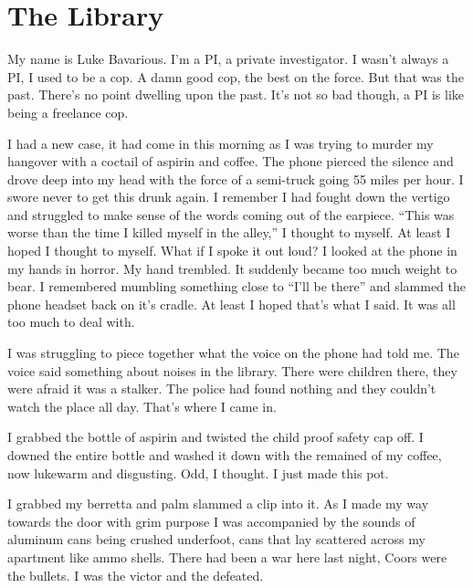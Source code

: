 \chapter{The Library}





My name is Luke Bavarious. I'm a PI, a private investigator. I
wasn't always a PI, I used to be a cop. A damn good cop, the best
on the force. But that was the past. There's no point dwelling upon
the past. It's not so bad though, a PI is like being a freelance
cop.



I had a new case, it had come in this morning as I was trying to
murder my hangover with a coctail of aspirin and coffee. The phone
pierced the silence and drove deep into my head with the force of a
semi-truck going 55 miles per hour. I swore never to get this drunk
again. I remember I had fought down the vertigo and struggled to
make sense of the words coming out of the earpiece. ``This was worse
than the time I killed myself in the alley,'' I thought to myself.
At least I hoped I thought to myself. What if I spoke it out loud?
I looked at the phone in my hands in horror. My hand trembled. It
suddenly became too much weight to bear. I remembered mumbling
something close to ``I'll be there'' and slammed the phone headset
back on it's cradle. At least I hoped that's what I said. It was
all too much to deal with.



I was struggling to piece together what the voice on the phone had
told me. The voice said something about noises in the library.
There were children there, they were afraid it was a stalker. The
police had found nothing and they couldn't watch the place all day.
That's where I came in.



I grabbed the bottle of aspirin and twisted the child proof safety
cap off. I downed the entire bottle and washed it down with the
remained of my coffee, now lukewarm and disgusting. Odd, I thought.
I just made this pot.



I grabbed my berretta and palm slammed a clip into it. As I made my
way towards the door with grim purpose I was accompanied by the
sounds of aluminum cans being crushed underfoot, cans that lay
scattered across my apartment like ammo shells. There had been a
war here last night, Coors were the bullets. I was the victor and
the defeated.



